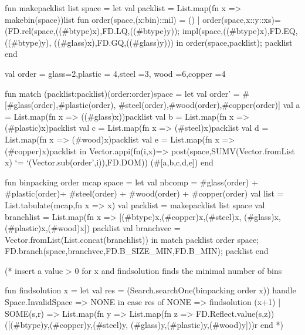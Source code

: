 \documentclass[a4paper]{scrartcl}
\begin{document}
\begin{myverbatim}
fun makepacklist list space = 
    let
        val packlist = List.map(fn x => makebin(space))list
        fun order(space,(x:bin)::nil) = ()
          | order(space,x::y::xs)=
                (FD.rel(space,((#btype)x),FD.LQ,((#btype)y));
                 impl(space,((#btype)x),FD.EQ,((#btype)y),
                            ((#glass)x),FD.GQ,((#glass)y))) 
    in
        order(space,packlist);
        packlist
    end                            

val order = {glass=2,plastic = 4,steel =3,
             wood =6,copper =4}

fun match (packlist:packlist)(order:order)space = 
    let
        val order' = #[#glass(order),#plastic(order),
             #steel(order),#wood(order),#copper(order)]
        val a = List.map(fn x => ((#glass)x))packlist
        val b = List.map(fn x => (#plastic)x)packlist
        val c = List.map(fn x => (#steel)x)packlist
        val d = List.map(fn x => (#wood)x)packlist
        val e = List.map(fn x => (#copper)x)packlist
    in 
        Vector.appi(fn(i,x)=> post(space,SUMV(Vector.fromList x)
                       `=  `(Vector.sub(order',i)),FD.DOM))
                   (#[a,b,c,d,e])
    end
          
              

fun binpacking order mcap space =
    let 
        val nbcomp = #glass(order) + #plastic(order)+ 
                     #steel(order) + #wood(order) + 
                     #copper(order)
        val list = List.tabulate(mcap,fn x => x)
        val packlist = makepacklist list space
        val branchlist = List.map(fn x =>
                          [(#btype)x,(#copper)x,(#steel)x,
                           (#glass)x,(#plastic)x,(#wood)x])
                         packlist
        val branchvec = Vector.fromList(List.concat(branchlist))
    in 
        match packlist order space;
        FD.branch(space,branchvec,FD.B_SIZE_MIN,FD.B_MIN);
        packlist
    end


(* insert a value > 0 for x and findsolution finds the 
   minimal number of bins 

 fun findsolution x =
   let 
      val res =  (Search.searchOne(binpacking order x))
                    handle Space.InvalidSpace => NONE
   in
      case res of NONE => findsolution (x+1)
                | SOME(s,r) => 
                     List.map(fn y =>
                         List.map(fn z => FD.Reflect.value(s,z))
                               ([(#btype)y,(#copper)y,(#steel)y,
                               (#glass)y,(#plastic)y,(#wood)y]))r
   end
*)
\end{myverbatim}
\end{document}
